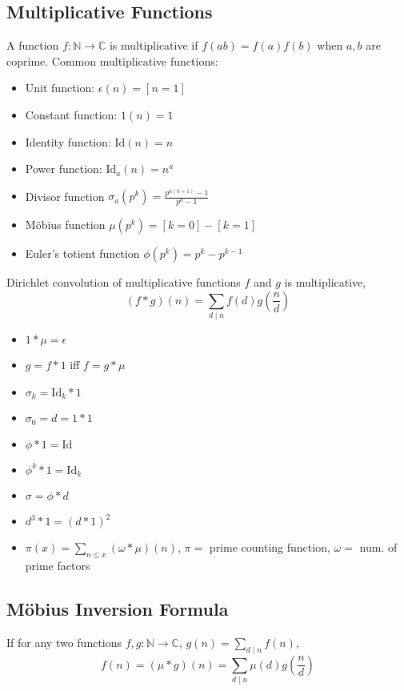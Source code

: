 \subsection{Multiplicative Functions}
A function $f : \mathbb{N} \to \mathbb{C}$ is multiplicative if
$f(ab) = f(a)f(b)$ when $a, b$ are coprime.
Common multiplicative functions:
\begin{itemize}
    \item Unit function: $\epsilon(n) = [n = 1]$
    \item Constant function: $1(n) = 1$
    \item Identity function: $\mathrm{Id}(n) = n$
    \item Power function: $\mathrm{Id}_a(n) = n^a$
    \item Divisor function $\sigma_a(p^k) = \frac{p^{a(k+1)} - 1}{p^a - 1}$
    \item Möbius function $\mu(p^k) = [k = 0] - [k = 1]$
    \item Euler's totient function $\phi(p^k) = p^k - p^{k-1}$
\end{itemize}
Dirichlet convolution of multiplicative functions $f$ and $g$ is multiplicative,
\[ (f*g)(n) = \sum_{d \mid n} f(d) g\left(\frac{n}{d}\right) \]
\begin{itemize}
    \item $1 * \mu = \epsilon$
    \item $g = f * 1$ iff $f = g * \mu$
    \item $\sigma_k = \mathrm{Id}_k * 1$
    \item $\sigma_0 = d = 1 * 1$
    \item $\phi * 1 = \mathrm{Id}$
    \item $\phi^k * 1 = \mathrm{Id}_k$
    \item $\sigma = \phi * d$
    \item $d^3 * 1 = (d * 1)^2$
    \item $\pi(x) = \sum_{n \leq x} (\omega * \mu)(n)$, $\pi = $ prime counting function, $\omega = $ num. of prime factors  
\end{itemize}
\subsection{Möbius Inversion Formula}
    If for any two functions $f, g : \mathbb{N} \to \mathbb{C}$, $g(n) = \sum_{d \mid n} f(n)$,
    \[ f(n) = (\mu * g)(n) = \sum_{d \mid n} \mu(d) g \left(\frac{n}{d}\right) \]
